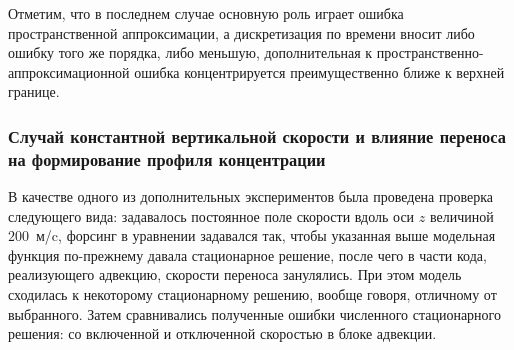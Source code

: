 \documentclass[14pt, a4paper]{extarticle}
\begin{document}
Отметим, что в последнем случае основную роль играет ошибка пространственной аппроксимации, а дискретизация по времени вносит либо ошибку того же порядка, либо меньшую, дополнительная к пространственно-аппроксимационной ошибка концентрируется преимущественно ближе к верхней границе.

\subsubsection{Случай константной вертикальной скорости и влияние переноса на формирование профиля концентрации}

В качестве одного из дополнительных экспериментов была проведена проверка следующего вида: задавалось постоянное поле скорости вдоль оси $z$ величиной $200$~м/c, форсинг в уравнении задавался так, чтобы указанная выше модельная функция по-прежнему давала стационарное решение, после чего в части кода, реализующего адвекцию, скорости переноса занулялись. При этом модель сходилась к некоторому стационарному решению, вообще говоря, отличному от выбранного. Затем сравнивались полученные ошибки численного стационарного решения: со включенной и отключенной скоростью в блоке адвекции. 

\begin{figure}[H]

\end{figure}
\end{document}
